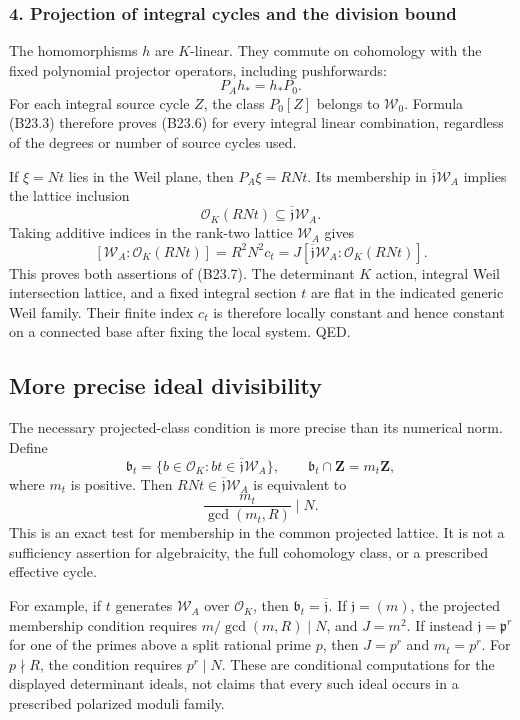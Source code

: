 \subsubsection{4. Projection of integral cycles and the division bound}\label{projection-of-integral-cycles-and-the-division-bound}

The homomorphisms \(h\) are \(K\)-linear. They commute on cohomology with the fixed polynomial projector operators, including pushforwards: \[
 P_Ah_*=h_*P_0.
\] For each integral source cycle \(Z\), the class \(P_0[Z]\) belongs to \(\mathscr W_0\). Formula (B23.3) therefore proves (B23.6) for every integral linear combination, regardless of the degrees or number of source cycles used.

If \(\xi=Nt\) lies in the Weil plane, then \(P_A\xi=RNt\). Its membership in \(\overline{\mathfrak j}\mathscr W_A\) implies the lattice inclusion \[
 \mathcal O_K(RNt)\subseteq\overline{\mathfrak j}\mathscr W_A.
\] Taking additive indices in the rank-two lattice \(\mathscr W_A\) gives \[
 [\mathscr W_A:\mathcal O_K(RNt)]
 =R^2N^2c_t
 =J[\overline{\mathfrak j}\mathscr W_A:\mathcal O_K(RNt)].
\] This proves both assertions of (B23.7). The determinant \(K\) action, integral Weil intersection lattice, and a fixed integral section \(t\) are flat in the indicated generic Weil family. Their finite index \(c_t\) is therefore locally constant and hence constant on a connected base after fixing the local system. QED.

\subsection{More precise ideal divisibility}\label{more-precise-ideal-divisibility}

The necessary projected-class condition is more precise than its numerical norm. Define \[
 \mathfrak b_t=\{b\in\mathcal O_K:bt\in\overline{\mathfrak j}\mathscr W_A\},
 \qquad
 \mathfrak b_t\cap\mathbf Z=m_t\mathbf Z,
\tag{B23.13}
\] where \(m_t\) is positive. Then \(RNt\in\overline{\mathfrak j}\mathscr W_A\) is equivalent to \[
 \frac{m_t}{\gcd(m_t,R)}\mid N.
\tag{B23.14}
\] This is an exact test for membership in the common projected lattice. It is not a sufficiency assertion for algebraicity, the full cohomology class, or a prescribed effective cycle.

For example, if \(t\) generates \(\mathscr W_A\) over \(\mathcal O_K\), then \(\mathfrak b_t=\overline{\mathfrak j}\). If \(\mathfrak j=(m)\), the projected membership condition requires \(m/\gcd(m,R)\mid N\), and \(J=m^2\). If instead \(\mathfrak j=\mathfrak p^r\) for one of the primes above a split rational prime \(p\), then \(J=p^r\) and \(m_t=p^r\). For \(p\nmid R\), the condition requires \(p^r\mid N\). These are conditional computations for the displayed determinant ideals, not claims that every such ideal occurs in a prescribed polarized moduli family.

